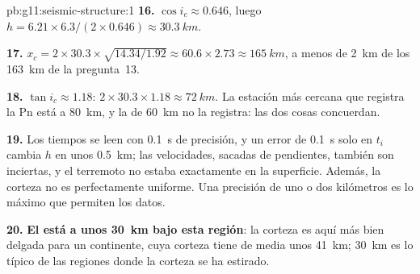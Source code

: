 \begin{solution}{pb:g11:seismic-structure:1}
\textbf{16.} $\cos i_c \approx 0.646$, luego $h = 6.21 \times 6.3/(2 \times
0.646) \approx \qty{30.3}{km}$.

\textbf{17.} $x_c = 2 \times 30.3 \times \sqrt{14.34/1.92} \approx 60.6 \times
2.73 \approx \qty{165}{km}$, a menos de \qty{2}{km} de los \qty{163}{km} de
la pregunta~13.

\textbf{18.} $\tan i_c \approx 1.18$: $2 \times 30.3 \times 1.18 \approx
\qty{72}{km}$. La estación más cercana que registra la Pn está a
\qty{80}{km}, y la de \qty{60}{km} no la registra: las dos cosas concuerdan.

\textbf{19.} Los tiempos se leen con \qty{0.1}{s} de precisión, y un error de
\qty{0.1}{s} solo en $t_i$ cambia $h$ en unos \qty{0.5}{km}; las velocidades,
sacadas de pendientes, también son inciertas, y el terremoto no estaba
exactamente en la superficie. Además, la corteza no es perfectamente
uniforme. Una precisión de uno o dos kilómetros es lo máximo que permiten
los datos.

\textbf{20.} \textbf{El  está a unos \qty{30}{km} bajo esta región}: la
corteza es aquí más bien delgada para un continente, cuya corteza tiene de
media unos \qty{41}{km}; \qty{30}{km} es lo típico de las regiones donde la
corteza se ha estirado.
\end{solution}
